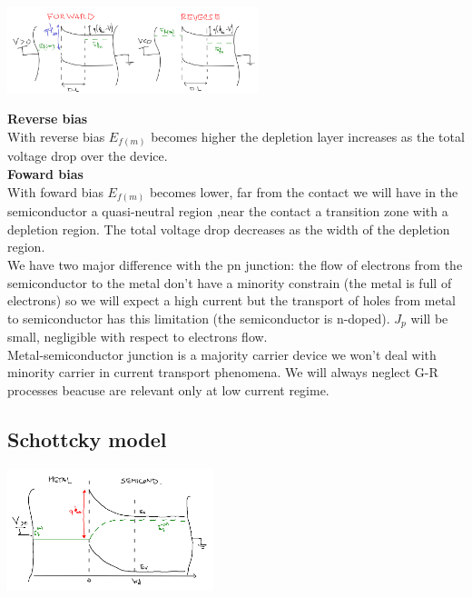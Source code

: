 \centering
\includegraphics[width=0.55\textwidth]{msbias.png}\\
\raggedright


{\bf Reverse bias}\\
With reverse bias $E_{f(m)}$ becomes higher the depletion layer increases as the total voltage drop over the device.\\ 
{\bf Foward bias}\\
With foward bias $E_{f(m)}$ becomes lower, far from the contact we will have in the semiconductor a quasi-neutral region ,near the contact a transition zone with a depletion region. The total voltage drop decreases as the width of the depletion region.\\
We have two major difference with the pn junction: the flow of electrons from the semiconductor to the metal  don't have a minority constrain (the metal is full of electrons) so we will expect a high current but the transport of holes from metal to semiconductor has this limitation (the semiconductor is n-doped). $J_p$ will be small, negligible with respect to electrons flow.\\
Metal-semiconductor junction is a majority carrier device we won't deal with minority carrier in current transport phenomena. We will always neglect G-R processes beacuse are relevant only at low current regime.\\
\subsection{Schottcky model}
\centering
\includegraphics[width=0.45\textwidth]{shk.png}\\
\raggedright

